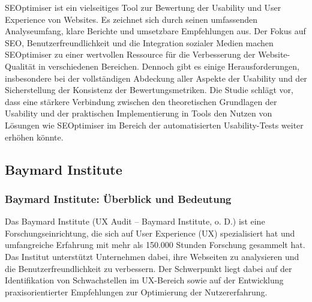 SEOptimiser ist ein vielseitiges Tool zur Bewertung der Usability und User Experience von Websites. Es zeichnet sich durch seinen umfassenden Analyseumfang, klare Berichte und umsetzbare Empfehlungen aus. Der Fokus auf SEO, Benutzerfreundlichkeit und die Integration sozialer Medien machen SEOptimiser zu einer wertvollen Ressource für die Verbesserung der Website-Qualität in verschiedenen Bereichen. Dennoch gibt es einige Herausforderungen, insbesondere bei der vollständigen Abdeckung aller Aspekte der Usability und der Sicherstellung der Konsistenz der Bewertungsmetriken. Die Studie schlägt vor, dass eine stärkere Verbindung zwischen den theoretischen Grundlagen der Usability und der praktischen Implementierung in Tools den Nutzen von Lösungen wie SEOptimiser im Bereich der automatisierten Usability-Tests weiter erhöhen könnte.

\subsection{Baymard Institute}
\label{sec:baymard_institute}

\subsubsection{Baymard Institute: Überblick und Bedeutung}
\label{ueblick_und_bedeutung}

Das Baymard Institute (UX Audit – Baymard Institute, o. D.) ist eine Forschungseinrichtung, die sich auf User Experience (UX) spezialisiert hat und umfangreiche Erfahrung mit mehr als 150.000 Stunden Forschung gesammelt hat. Das Institut unterstützt Unternehmen dabei, ihre Webseiten zu analysieren und die Benutzerfreundlichkeit zu verbessern. Der Schwerpunkt liegt dabei auf der Identifikation von Schwachstellen im UX-Bereich sowie auf der Entwicklung praxisorientierter Empfehlungen zur Optimierung der Nutzererfahrung.

